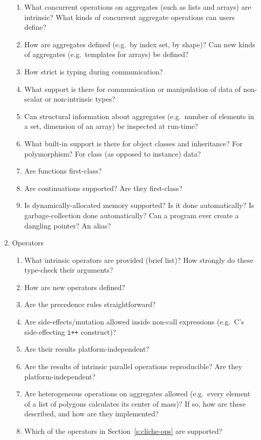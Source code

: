 \begin{small}
\begin{enumerate}
\begin{enumerate}
  \item What concurrent operations on aggregates
	(such as lists and arrays) are intrinsic?
	What kinds of concurrent aggregate operations can users define?
  \item How are aggregates defined (e.g.\ by index set, by shape)?
	Can new kinds of aggregates (e.g.\ templates for arrays)
	be defined?
  \item How strict is typing during communication?
  \item What support is there for communication or manipulation
	of data of non-scalar or non-intrinsic types?
  \item Can structural information about aggregates
	(e.g.\ number of elements in a set, dimension of an array)
	be inspected at run-time?
  \item What built-in support is there for object classes and inheritance?
	For polymorphism?
	For class (as opposed to instance) data?
  \item Are functions first-class?
  \item Are continuations supported?  Are they first-class?
  \item Is dynamically-allocated memory supported?
	Is it done automatically?
	Is garbage-collection done automatically?
	Can a program ever create a dangling pointer?
	An alias?
  \end{enumerate}
\item Operators
  \begin{enumerate}
  \item What intrinsic operators are provided (brief list)?
	How strongly do these type-check their arguments?
  \item How are new operators defined?
  \item Are the precedence rules straightforward?
  \item Are side-effects/mutation allowed inside non-call expressions
	(e.g.\ C's side-effecting \verb`i++` construct)?
  \item Are their results platform-independent?
  \item Are the results of intrinsic parallel operations reproducible?
	Are they platform-independent?
  \item Are heterogeneous operations on aggregates allowed
	(e.g.\ every element of a list of polygons calculates its
	center of mass)?
	If so, how are these described, and how are they implemented?
  \item Which of the operators in Section~\ref{s:cliche-ops} are supported?

\end{enumerate}
\end{enumerate}
\end{small}
